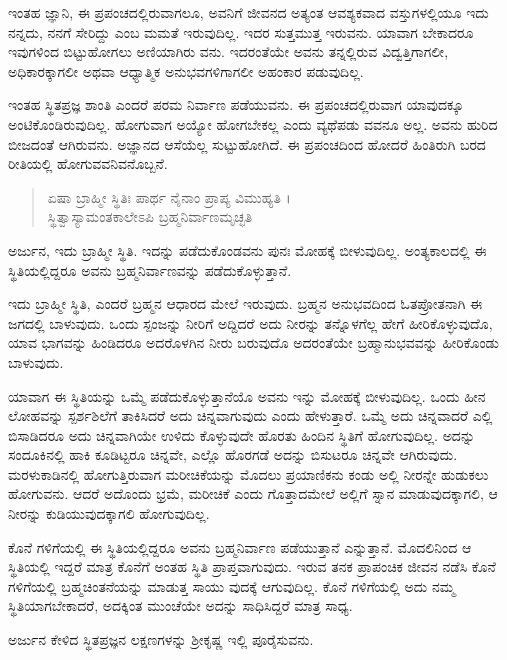 ಇಂತಹ ಜ್ಞಾನಿ, ಈ ಪ್ರಪಂಚದಲ್ಲಿರುವಾಗಲೂ, ಅವನಿಗೆ ಜೀವನದ ಅತ್ಯಂತ ಆವಶ್ಯಕವಾದ ವಸ್ತುಗಳಲ್ಲಿಯೂ ಇದು ನನ್ನದು, ನನಗೆ ಸೇರಿದ್ದು ಎಂಬ ಮಮತೆ ಇರುವುದಿಲ್ಲ. ಇದರ ಸುತ್ತಮುತ್ತ ಇರುವನು. ಯಾವಾಗ ಬೇಕಾದರೂ ಇವುಗಳಿಂದ ಬಿಟ್ಟುಹೋಗಲು ಅಣಿಯಾಗಿರು ವನು. ಇದರಂತೆಯೇ ಅವನು ತನ್ನಲ್ಲಿರುವ ವಿದ್ವತ್ತಿಗಾಗಲೀ, ಅಧಿಕಾರಕ್ಕಾಗಲೀ ಅಥವಾ ಆಧ್ಯಾತ್ಮಿಕ ಅನುಭವಗಳಿಗಾಗಲೀ ಅಹಂಕಾರ ಪಡುವುದಿಲ್ಲ.

ಇಂತಹ ಸ್ಥಿತಪ್ರಜ್ಞ ಶಾಂತಿ ಎಂದರೆ ಪರಮ ನಿರ್ವಾಣ ಪಡೆಯುವನು. ಈ ಪ್ರಪಂಚದಲ್ಲಿರುವಾಗ ಯಾವುದಕ್ಕೂ ಅಂಟಿಕೊಂಡಿರುವುದಿಲ್ಲ. ಹೋಗುವಾಗ ಅಯ್ಯೋ ಹೋಗಬೇಕಲ್ಲ ಎಂದು ವ್ಯಥೆಪಡು ವವನೂ ಅಲ್ಲ. ಅವನು ಹುರಿದ ಬೀಜದಂತೆ ಆಗಿರುವನು. ಅಜ್ಞಾನದ ಆಸೆಯೆಲ್ಲ ಸುಟ್ಟುಹೋಗಿದೆ. ಈ ಪ್ರಪಂಚದಿಂದ ಹೋದರೆ ಹಿಂತಿರುಗಿ ಬರದ ರೀತಿಯಲ್ಲಿ ಹೋಗುವವನಿವನೊಬ್ಬನೆ.

\begin{verse}
ಏಷಾ ಬ್ರಾಹ್ಮೀ ಸ್ಥಿತಿಃ ಪಾರ್ಥ ನೈನಾಂ ಪ್ರಾಪ್ಯ ವಿಮುಹ್ಯತಿ ।\\ಸ್ಥಿತ್ವಾಸ್ಯಾಮಂತಕಾಲೇಽಪಿ ಬ್ರಹ್ಮನಿರ್ವಾಣಮೃಚ್ಛತಿ 
\end{verse}

{\small ಅರ್ಜುನ, ಇದು ಬ್ರಾಹ್ಮೀ ಸ್ಥಿತಿ. ಇದನ್ನು ಪಡೆದುಕೊಂಡವನು ಪುನಃ ಮೋಹಕ್ಕೆ ಬೀಳುವುದಿಲ್ಲ. ಅಂತ್ಯಕಾಲದಲ್ಲಿ ಈ ಸ್ಥಿತಿಯಲ್ಲಿದ್ದರೂ ಅವನು ಬ್ರಹ್ಮನಿರ್ವಾಣವನ್ನು ಪಡೆದುಕೊಳ್ಳುತ್ತಾನೆ.}

ಇದು ಬ್ರಾಹ್ಮೀ ಸ್ಥಿತಿ, ಎಂದರೆ ಬ್ರಹ್ಮನ ಆಧಾರದ ಮೇಲೆ ಇರುವುದು. ಬ್ರಹ್ಮನ ಅನುಭವದಿಂದ ಓತಪ್ರೋತನಾಗಿ ಈ ಜಗದಲ್ಲಿ ಬಾಳುವುದು. ಒಂದು ಸ್ಪಂಜನ್ನು ನೀರಿಗೆ ಅದ್ದಿದರೆ ಅದು ನೀರನ್ನು ತನ್ನೊಳಗೆಲ್ಲ ಹೇಗೆ ಹೀರಿಕೊಳ್ಳುವುದೊ, ಯಾವ ಭಾಗವನ್ನು ಹಿಂಡಿದರೂ ಅದರೊಳಗಿನ ನೀರು ಬರುವುದೊ ಅದರಂತೆಯೇ ಬ್ರಹ್ಮಾನುಭವವನ್ನು ಹೀರಿಕೊಂಡು ಬಾಳುವುದು.

ಯಾವಾಗ ಈ ಸ್ಥಿತಿಯನ್ನು ಒಮ್ಮೆ ಪಡೆದುಕೊಳ್ಳುತ್ತಾನೆಯೊ ಅವನು ಇನ್ನು ಮೋಹಕ್ಕೆ ಬೀಳುವುದಿಲ್ಲ. ಒಂದು ಹೀನ ಲೋಹವನ್ನು ಸ್ಪರ್ಶಶಿಲೆಗೆ ತಾಕಿಸಿದರೆ ಅದು ಚಿನ್ನವಾಗುವುದು ಎಂದು ಹೇಳುತ್ತಾರೆ. ಒಮ್ಮೆ ಅದು ಚಿನ್ನವಾದರೆ ಎಲ್ಲಿ ಬಿಸಾಡಿದರೂ ಅದು ಚಿನ್ನವಾಗಿಯೇ ಉಳಿದು ಕೊಳ್ಳುವುದೇ ಹೊರತು ಹಿಂದಿನ ಸ್ಥಿತಿಗೆ ಹೋಗುವುದಿಲ್ಲ. ಅದನ್ನು ಸಂದೂಕಿನಲ್ಲಿ ಹಾಕಿ ಕೂಡಿಟ್ಟರೂ ಚಿನ್ನವೇ, ಎಲ್ಲೊ ಹೊರಗಡೆ ಅದನ್ನು ಬಿಸುಟರೂ ಚಿನ್ನವೇ ಆಗಿರುವುದು. ಮರಳುಕಾಡಿನಲ್ಲಿ ಹೋಗುತ್ತಿರುವಾಗ ಮರೀಚಿಕೆಯನ್ನು ಮೊದಲು ಪ್ರಯಾಣಿಕನು ಕಂಡು ಅಲ್ಲಿ ನೀರನ್ನೇ ಹುಡುಕಲು ಹೋಗುವನು. ಆದರೆ ಅದೊಂದು ಭ್ರಮೆ, ಮರೀಚಿಕೆ ಎಂದು ಗೊತ್ತಾದಮೇಲೆ ಅಲ್ಲಿಗೆ ಸ್ನಾನ ಮಾಡುವುದಕ್ಕಾಗಲಿ, ಆ ನೀರನ್ನು ಕುಡಿಯುವುದಕ್ಕಾಗಲಿ ಹೋಗುವುದಿಲ್ಲ.

ಕೊನೆ ಗಳಿಗೆಯಲ್ಲಿ ಈ ಸ್ಥಿತಿಯಲ್ಲಿದ್ದರೂ ಅವನು ಬ್ರಹ್ಮನಿರ್ವಾಣ ಪಡೆಯುತ್ತಾನೆ ಎನ್ನುತ್ತಾನೆ. ಮೊದಲಿನಿಂದ ಆ ಸ್ಥಿತಿಯಲ್ಲಿ ಇದ್ದರೆ ಮಾತ್ರ ಕೊನೆಗೆ ಅಂತಹ ಸ್ಥಿತಿ ಪ್ರಾಪ್ತವಾಗುವುದು. ಇರುವ ತನಕ ಪ್ರಾಪಂಚಿಕ ಜೀವನ ನಡೆಸಿ ಕೊನೆ ಗಳಿಗೆಯಲ್ಲಿ ಬ್ರಹ್ಮಚಿಂತನೆಯನ್ನು ಮಾಡುತ್ತ ಸಾಯು ವುದಕ್ಕೆ ಆಗುವುದಿಲ್ಲ. ಕೊನೆ ಗಳಿಗೆಯಲ್ಲಿ ಅದು ನಮ್ಮ ಸ್ಥಿತಿಯಾಗಬೇಕಾದರೆ, ಅದಕ್ಕಿಂತ ಮುಂಚೆಯೇ ಅದನ್ನು ಸಾಧಿಸಿದ್ದರೆ ಮಾತ್ರ ಸಾಧ್ಯ.

ಅರ್ಜುನ ಕೇಳಿದ ಸ್ಥಿತಪ್ರಜ್ಞನ ಲಕ್ಷಣಗಳನ್ನು ಶ್ರೀಕೃಷ್ಣ ಇಲ್ಲಿ ಪೂರೈಸುವನು.

